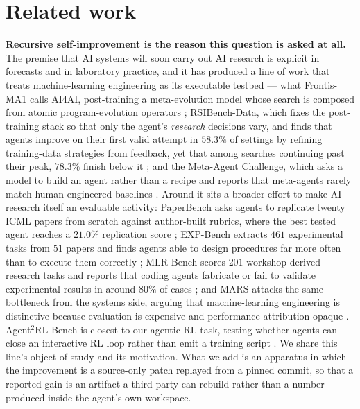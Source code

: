 \section{Related work}
\label{sec:related}

\textbf{Recursive self-improvement is the reason this question is asked at all.} The premise that AI
systems will soon carry out AI research is explicit in forecasts and in laboratory practice, and it has
produced a line of work that treats machine-learning engineering as its executable testbed --- what
Frontis-MA1 calls AI4AI, post-training a meta-evolution model whose search is composed from atomic
program-evolution operators \citep{yang2026frontis}; RSIBench-Data, which fixes the post-training stack
so that only the agent's \emph{research} decisions vary, and finds that agents improve on their first valid
attempt in $58.3\%$ of settings by refining training-data strategies from feedback, yet that among
searches continuing past their peak, $78.3\%$ finish below it \citep{meng2026rsibench}; and the Meta-Agent Challenge, which asks a model to
build an agent rather than a recipe and reports that meta-agents rarely match human-engineered
baselines \citep{lu2026metaagent}. Around it sits a broader effort to make AI research itself an evaluable
activity: PaperBench asks agents to replicate twenty ICML papers from scratch against author-built
rubrics, where the best tested agent reaches a $21.0\%$ replication score \citep{starace2025paperbench};
EXP-Bench extracts $461$ experimental tasks from $51$ papers and finds agents able to design procedures
far more often than to execute them correctly \citep{kon2025expbench}; MLR-Bench scores $201$
workshop-derived research tasks and reports that coding agents fabricate or fail to validate
experimental results in around $80\%$ of cases \citep{chen2025mlrbench}; and MARS attacks the same
bottleneck from the systems side, arguing that machine-learning engineering is distinctive because
evaluation is expensive and performance attribution opaque \citep{chen2026mars}. Agent$^2$RL-Bench is
closest to our agentic-RL task, testing whether agents can close an interactive RL loop rather than
emit a training script \citep{chen2026agent2rlbench}. We share this line's object of study and its
motivation. What we add is an apparatus in which the improvement is a source-only patch replayed from
a pinned commit, so that a reported gain is an artifact a third party can rebuild rather than a number
produced inside the agent's own workspace.


